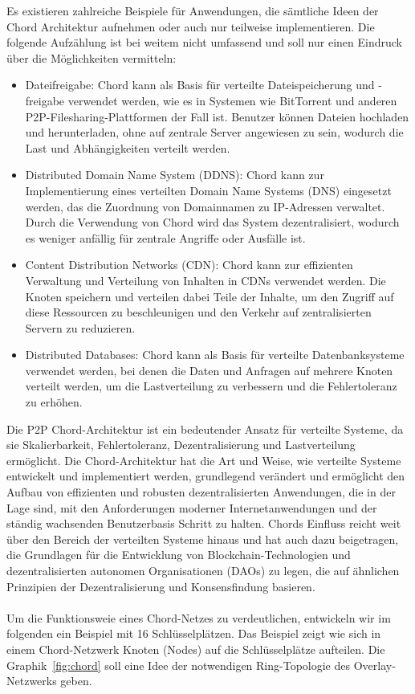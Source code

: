 Es existieren zahlreiche Beispiele für Anwendungen, die sämtliche Ideen der Chord Architektur aufnehmen oder auch nur teilweise implementieren. Die folgende Aufzählung ist bei weitem nicht umfassend und soll nur einen Eindruck über die Möglichkeiten vermitteln:
\begin{itemize} 
\item Dateifreigabe: Chord kann als Basis für verteilte Dateispeicherung und -freigabe verwendet werden, wie es in Systemen wie BitTorrent und anderen P2P-Filesharing-Plattformen der Fall ist. Benutzer können Dateien hochladen und herunterladen, ohne auf zentrale Server angewiesen zu sein, wodurch die Last und Abhängigkeiten verteilt werden.
\item Distributed Domain Name System (DDNS): Chord kann zur Implementierung eines verteilten Domain Name Systems (DNS) eingesetzt werden, das die Zuordnung von Domainnamen zu IP-Adressen verwaltet. Durch die Verwendung von Chord wird das System dezentralisiert, wodurch es weniger anfällig für zentrale Angriffe oder Ausfälle ist.
\item Content Distribution Networks (CDN): Chord kann zur effizienten Verwaltung und Verteilung von Inhalten in CDNs verwendet werden. Die Knoten speichern und verteilen dabei Teile der Inhalte, um den Zugriff auf diese Ressourcen zu beschleunigen und den Verkehr auf zentralisierten Servern zu reduzieren.
\item Distributed Databases: Chord kann als Basis für verteilte Datenbanksysteme verwendet werden, bei denen die Daten und Anfragen auf mehrere Knoten verteilt werden, um die Lastverteilung zu verbessern und die Fehlertoleranz zu erhöhen.
\end{itemize}     

Die P2P Chord-Architektur ist ein bedeutender Ansatz für verteilte Systeme, da sie Skalierbarkeit, Fehlertoleranz, Dezentralisierung und Lastverteilung ermöglicht.  Die Chord-Architektur hat die Art und Weise, wie verteilte Systeme entwickelt und implementiert werden, grundlegend verändert und ermöglicht den Aufbau von effizienten und robusten dezentralisierten Anwendungen, die in der Lage sind, mit den Anforderungen moderner Internetanwendungen und der ständig wachsenden Benutzerbasis Schritt zu halten. Chords Einfluss reicht weit über den Bereich der verteilten Systeme hinaus und hat auch dazu beigetragen, die Grundlagen für die Entwicklung von Blockchain-Technologien und dezentralisierten autonomen Organisationen (DAOs) zu legen, die auf ähnlichen Prinzipien der Dezentralisierung und Konsensfindung basieren.
\\\\
Um die Funktionsweie eines Chord-Netzes zu verdeutlichen, entwickeln wir im folgenden ein Beispiel mit 16 Schlüsselplätzen. Das Beispiel zeigt wie sich in einem Chord-Netzwerk Knoten (Nodes) auf die Schlüsselplätze aufteilen.
Die Graphik~\ref{fig:chord} soll eine Idee der notwendigen Ring-Topologie des Overlay-Netzwerks geben.  


